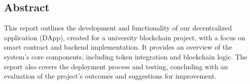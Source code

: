 \documentclass[../main.tex]{subfiles}
\begin{document}
\subsection{Abstract}

This report outlines the development and functionality of our decentralized application (DApp), created for a university blockchain project, with a focus on smart contract and backend implementation. It provides an overview of the system’s core components, including token integration and blockchain logic. The report also covers the deployment process and testing, concluding with an evaluation of the project’s outcomes and suggestions for improvement.
\end{document}
